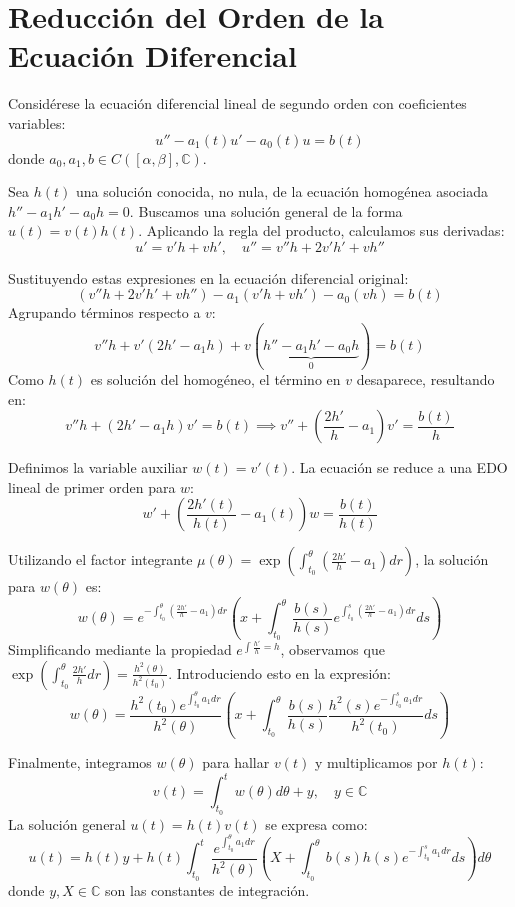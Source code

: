 ﻿\section{Reducción del Orden de la Ecuación Diferencial}

Considérese la ecuación diferencial lineal de segundo orden con coeficientes variables:
\[
    u'' - a_1(t) u' - a_0(t) u = b(t) \label{eq:edo_reduccion}
\]
donde $a_0, a_1, b \in C([\alpha, \beta], \mathbb{C})$. 

Sea $h(t)$ una solución conocida, no nula, de la ecuación homogénea asociada $h'' - a_1 h' - a_0 h = 0$. Buscamos una solución general de la forma $u(t) = v(t)h(t)$. Aplicando la regla del producto, calculamos sus derivadas:
\[
    u' = v'h + vh', \quad u'' = v''h + 2v'h' + vh''
\]

Sustituyendo estas expresiones en la ecuación diferencial original:
\[
    (v''h + 2v'h' + vh'') - a_1(v'h + vh') - a_0(vh) = b(t)
\]
Agrupando términos respecto a $v$:
\[
    v''h + v'(2h' - a_1h) + v(\underbrace{h'' - a_1h' - a_0h}_{0}) = b(t)
\]
Como $h(t)$ es solución del homogéneo, el término en $v$ desaparece, resultando en:
\[
    v''h + (2h' - a_1h)v' = b(t) \implies v'' + \left( \frac{2h'}{h} - a_1 \right)v' = \frac{b(t)}{h}
\]

Definimos la variable auxiliar $w(t) = v'(t)$. La ecuación se reduce a una EDO lineal de primer orden para $w$:
\[
    w' + \left( \frac{2h'(t)}{h(t)} - a_1(t) \right)w = \frac{b(t)}{h(t)} 
\]

Utilizando el factor integrante $\mu(\theta) = \exp\left( \int_{t_0}^{\theta} \left( \frac{2h'}{h} - a_1 \right) dr \right)$, la solución para $w(\theta)$ es:
\[
    w(\theta) = e^{-\int_{t_0}^{\theta} \left( \frac{2h'}{h} - a_1 \right) dr} \left( x + \int_{t_0}^{\theta} \frac{b(s)}{h(s)} e^{\int_{t_0}^{s} \left( \frac{2h'}{h} - a_1 \right) dr} ds \right)
\]
Simplificando mediante la propiedad $e^{\int \frac{h'}{h} = h}$, observamos que $\exp(\int_{t_0}^{\theta} \frac{2h'}{h} dr) = \frac{h^2(\theta)}{h^2(t_0)}$. Introduciendo esto en la expresión:
\[
    w(\theta) = \frac{h^2(t_0) e^{\int_{t_0}^{\theta} a_1 dr}}{h^2(\theta)} \left( x + \int_{t_0}^{\theta} \frac{b(s)}{h(s)} \frac{h^2(s) e^{-\int_{t_0}^{s} a_1 dr}}{h^2(t_0)} ds \right)
\]

Finalmente, integramos $w(\theta)$ para hallar $v(t)$ y multiplicamos por $h(t)$:
\[
    v(t) = \int_{t_0}^{t} w(\theta) d\theta + y, \quad y \in \mathbb{C}
\]
La solución general $u(t) = h(t)v(t)$ se expresa como:
\[
    u(t) = h(t)y + h(t) \int_{t_0}^{t} \frac{e^{\int_{t_0}^{\theta} a_1 dr}}{h^2(\theta)} \left( X + \int_{t_0}^{\theta} b(s)h(s)e^{-\int_{t_0}^{s} a_1 dr} ds \right) d\theta
\]
donde $y, X \in \mathbb{C}$ son las constantes de integración.

